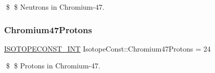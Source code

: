 \$ \$ Neutrons in Chromium-\/47. \mbox{\label{group___isotope_const-_chromium-_cr47_ga12a743f88d3ce0ae27482619da60f9d3}} 
\subsubsection{\texorpdfstring{Chromium47\+Protons}{Chromium47Protons}}
{\footnotesize\ttfamily \mbox{\hyperlink{group___isotope_const-_macros_ga5f18360b3e99483a35c32d789e62621c}{I\+S\+O\+T\+O\+P\+E\+C\+O\+N\+S\+T\+\_\+\+I\+NT}} Isotope\+Const\+::\+Chromium47\+Protons = 24}

\$ \$ Protons in Chromium-\/47. 